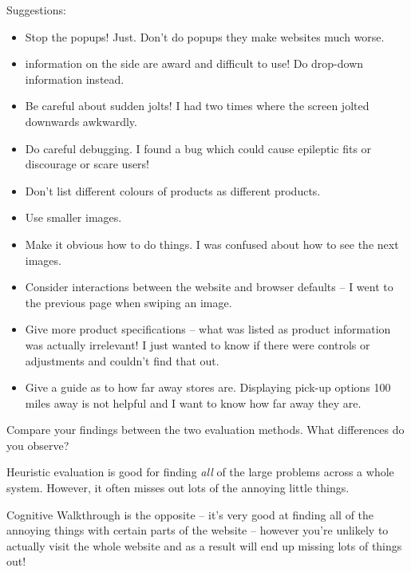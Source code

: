 \documentclass[10pt,\jkfside,a4paper]{article}
\begin{document}
\begin{enumerate}
Suggestions:

\begin{itemize}

\item Stop the popups! Just. Don't do popups they make websites much worse.

\item information on the side are award and difficult to use! Do drop-down
information instead.

\item Be careful about sudden jolts! I had two times where the screen jolted
downwards awkwardly.

\item Do careful debugging. I found a bug which could cause epileptic fits
or discourage or scare users!

\item Don't list different colours of products as different products.

\item Use smaller images.

\item Make it obvious how to do things. I was confused about how to see the next
images.

\item Consider interactions between the website and browser defaults -- I went
to the previous page when swiping an image.

\item Give more product specifications -- what was listed as product information was
actually irrelevant! I just wanted to know if there were controls or adjustments
and couldn't find that out.

\item Give a guide as to how far away stores are. Displaying pick-up options 100 miles
away is not helpful and I want to know how far away they are.

\end{itemize}

\end{enumerate}

Compare your findings between the two evaluation methods. What differences do you observe?

Heuristic evaluation is good for finding \textit{all} of the large problems across a whole
system. However, it often misses out lots of the annoying little things.

Cognitive Walkthrough is the opposite -- it's very good at finding all of the annoying
things with certain parts of the website -- however you're unlikely to actually
visit the whole website and as a result will end up missing lots of things out!
\end{document}
